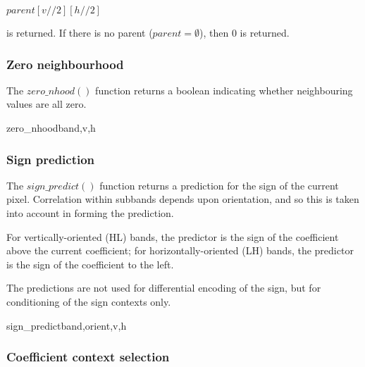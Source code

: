$parent[v//2][h//2]$

is returned. If there is no parent ($parent=\emptyset$), then 0 is returned.

\subsubsection{Zero neighbourhood}
\label{zeronhood}

The $zero\_nhood()$ function returns a boolean indicating whether neighbouring
values are all zero.

\begin{pseudo}{zero\_nhood}{band,v,h}
    \bsRET{\false}
  \bsEND
      \bsRET{\false}
    \bsEND
  \bsEND
\bsELSE
      \bsRET{\false}
    \bsEND
  \bsEND
\bsEND
\bsRET{\true}
\end{pseudo}

\subsubsection{Sign prediction}
\label{signpredict}

The $sign\_predict()$ function returns a prediction for the sign of the 
current pixel. Correlation within subbands depends upon orientation,
and so this is taken into account in forming the prediction.

For vertically-oriented (HL) bands, the predictor is the sign of the
coefficient above the current coefficient; for horizontally-oriented (LH)
bands, the predictor is the sign of the coefficient to the left. 

The predictions are not used for differential encoding of the sign, but for
conditioning of the sign contexts only.

\begin{pseudo}{sign\_predict}{band,orient,v,h}
  \bsELSE
  \bsEND
{}
  \bsELSE
  \bsEND
\bsELSE
\bsEND{}
\end{pseudo}

\subsubsection{Coefficient context selection}
\label{selectcoeffcontext}


